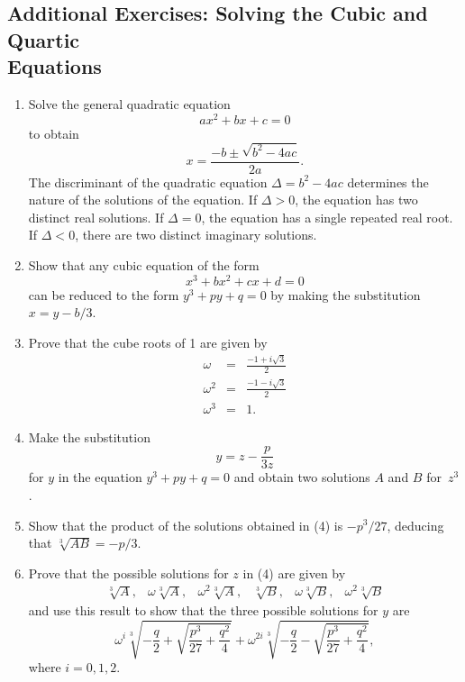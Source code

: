 \subsection*{Additional Exercises:  Solving the Cubic and Quartic \\
Equations}

{\small
 
\begin{enumerate}
 
\item
Solve the general quadratic equation 
$$
ax^2 + bx + c = 0
$$
to obtain
$$
x = \frac{-b \pm \sqrt{b^2 - 4ac}}{2a}.
$$
The {\bfi discriminant\/} of the quadratic equation $\Delta = b^2 - 4ac$ determines the nature of the solutions of the equation.  If $\Delta > 0$, the equation has two distinct real solutions.  If $\Delta = 0$, the equation has a single repeated real root. If $\Delta < 0$, there are two distinct imaginary solutions. 

\item
Show that any cubic equation of the form
$$
x^3 + bx^2 + cx + d = 0
$$
can be reduced to the form $y^3 + py + q = 0$ by making the substitution $x = y - b/3$.

\item
Prove that the cube roots of 1 are given by
\begin{eqnarray*}
\omega & = & \frac{-1+ i \sqrt{3}}{2} \\
\omega^2 & = & \frac{-1- i \sqrt{3}}{2} \\
\omega^3 & = & 1.
\end{eqnarray*}

\item
Make the substitution 
$$
y = z - \frac{p}{3 z}
$$
for $y$ in the equation $y^3 + py + q = 0$ and obtain two solutions $A$ and $B$ for~$z^3$.

\item
Show that the product of the solutions obtained in (4) is $-p^3/27$, deducing that $\sqrt[3]{A B} = -p/3$.

\item 
Prove that the possible solutions for $z$ in (4) are given by 
$$
\begin{array}{cccccc}
\sqrt[3]{A}, & \omega \sqrt[3]{A}, & \omega^2 \sqrt[3]{A}, &
\sqrt[3]{B}, & \omega \sqrt[3]{B}, & \omega^2 \sqrt[3]{B}
\end{array}
$$
and use this result to show that the three possible solutions for $y$
are 
$$
\omega^i \sqrt[3]{-\frac{q}{2}+ \sqrt{\frac{p^3}{27}  + \frac{q^2}{4}}  } +
\omega^{2i} \sqrt[3]{-\frac{q}{2}- \sqrt{\frac{p^3}{27}  + \frac{q^2}{4}}  },
$$
where $i = 0, 1, 2$.
 

\end{enumerate}}
